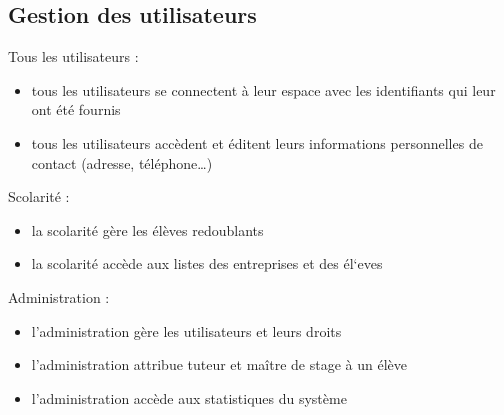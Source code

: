 \documentclass{scrreprt}
\begin{document}
\subsection{Gestion des utilisateurs}
Tous les utilisateurs :
\begin{itemize}
\item tous les utilisateurs se connectent \`a leur espace avec les identifiants qui leur ont \'et\'e fournis
\item tous les utilisateurs acc\`edent et \'editent leurs informations personnelles de contact (adresse, t\'el\'ephone…)
\end{itemize}
Scolarit\'e :
\begin{itemize}
\item la scolarit\'e g\`ere les \'el\`eves redoublants
\item la scolarit\'e acc\`ede aux listes des entreprises et des \'el`eves
\end{itemize}
Administration : 
\begin{itemize}
\item l’administration g\`ere les utilisateurs et leurs droits
\item l’administration attribue tuteur et ma\^itre de stage \`a un \'el\`eve
\item l’administration acc\`ede aux statistiques du syst\`eme
\end{itemize}
\end{document}
